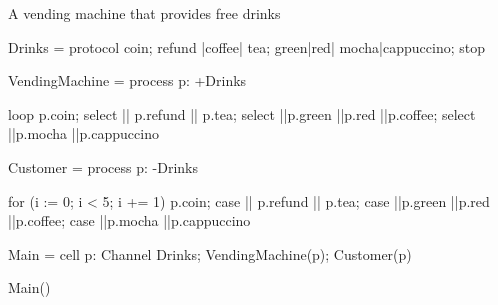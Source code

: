 A vending machine that provides free drinks
\begin{code}
Drinks = protocol { coin; refund |coffee| tea; green|red| mocha|cappuccino; stop }

VendingMachine = process p: +Drinks
{
    loop{
        p.coin;
        select
	    {
          || p.refund
		  || p.tea;
          select
          {
            ||p.green
            ||p.red
          }
          ||p.coffee;
          select
          {
            ||p.mocha
            ||p.cappuccino
          }
	   }
    }

}

Customer = process p: -Drinks
{
	
    for (i := 0; i < 5; i += 1)
    {
        p.coin;
        case{
              || p.refund
    		  || p.tea;
              case
              {
                ||p.green
                ||p.red
              }
              ||p.coffee;
              case
              {
                ||p.mocha
                ||p.cappuccino
              }
            }
    }
}

Main = cell
{	
	p: Channel Drinks;
	VendingMachine(p);
	Customer(p)
}

Main()
\end{code}
